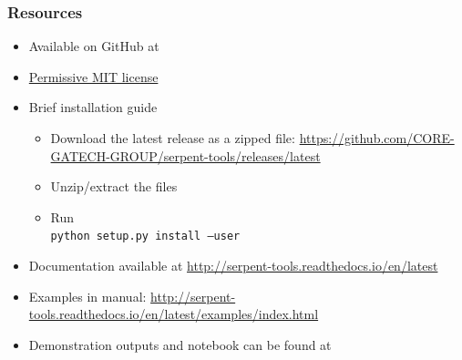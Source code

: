 \begin{frame}
    \frametitle{Resources}
            \begin{itemize}
                \item Available on GitHub at \github{}
                \item \href{https://github.com/CORE-GATECH-GROUP/serpent-tools/blob/master/LICENSE}{Permissive MIT license}
                \item Brief installation guide
                    \begin{itemize}
                        \item Download the latest release as a zipped file: \url{https://github.com/CORE-GATECH-GROUP/serpent-tools/releases/latest}
                        \item Unzip/extract the files
                        \item Run \\ \texttt{python setup.py install --user}
                    \end{itemize}
                \item Documentation available at \url{http://serpent-tools.readthedocs.io/en/latest}
                \item<handout> Examples in manual: \url{http://serpent-tools.readthedocs.io/en/latest/examples/index.html}
                \item<handout> Demonstration outputs and notebook can be found at \repo
            \end{itemize}
\end{frame}


